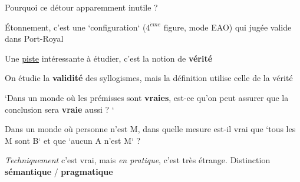\begin{frame}
	
	\begin{description}[labelindent=6pt,style=multiline,leftmargin=1.3in]
		 \setlength\itemsep{1em}
		 \item[Euh, ok ?] Pourquoi ce détour apparemment inutile ?\pause
		 \item[] Étonnement, c'est une `configuration` ($4^{\grave{e}me}$ figure, mode EAO) qui jugée valide dans Port-Royal
		 \end{description}

 \pause	 
	\begin{description}[labelindent=6pt,style=multiline,leftmargin=1.3in]
		 \setlength\itemsep{1em}
		 \item[Alors quoi ?] Une \underline{piste} intéressante à étudier, c'est la notion de \textbf{vérité}
 	\end{description}
\end{frame}


\begin{frame}
	
	\begin{description}[labelindent=6pt,style=multiline,leftmargin=1.3in]
		 \setlength\itemsep{1em}
		 \item[Attention] On étudie la \textbf{validité} des syllogismes, mais la définition utilise celle de la vérité\pause
		 \item[] `Dans un monde où les prémisses sont \textbf{vraies}, est-ce qu'on peut assurer que la conclusion sera \textbf{vraie} aussi ? `\pause
		 \item[Question] Dans un monde où personne n'est M, dans quelle mesure est-il vrai que `tous les M sont B` et que `aucun A n'est M` ?\pause
		 \item[Réponse] \textit{Techniquement} c'est vrai, mais \textit{en pratique}, c'est très étrange. \pause Distinction \textbf{sémantique} / \textbf{pragmatique}
 	\end{description}
\end{frame}




